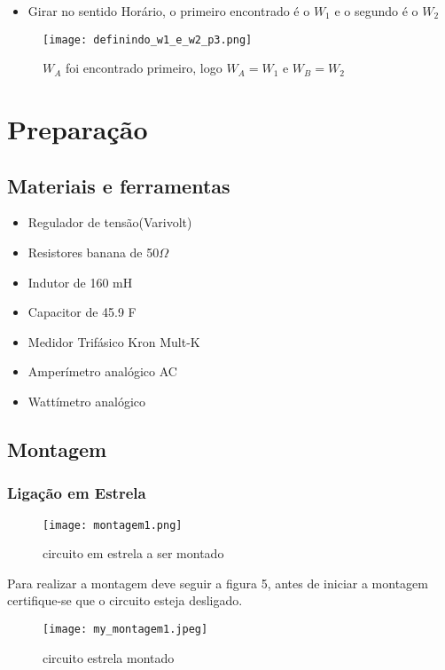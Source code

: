 \documentclass[a4paper, 12pt]{article}
\begin{document}
	\newpage
	\begin{itemize}
		\item Girar no sentido Horário, o primeiro encontrado é o $W_1$ e o segundo é o $W_2$
	\end{itemize}
	\begin{figure}[H]
		\centering %
		\texttt{[image: definindo\_w1\_e\_w2\_p3.png]}
		\caption{$W_A$ foi encontrado primeiro, logo $W_A = W_1$ e $W_B = W_2$}
	\end{figure}
	\newpage
	\section{Preparação}
	\subsection{Materiais e ferramentas}
	\begin{itemize}
		\item Regulador de tensão(Varivolt)
		\item Resistores banana de 50\(\Omega\)
		\item Indutor de 160 mH
		\item Capacitor de 45.9 \si{\micro}F
		\item Medidor Trifásico Kron Mult-K
		\item Amperímetro analógico AC
		\item Wattímetro analógico
	\end{itemize}
	\subsection{Montagem}
	\subsubsection{Ligação em Estrela}
	\begin{figure}[H]
		\centering %
		\texttt{[image: montagem1.png]}
		\caption{circuito em estrela a ser montado}
	\end{figure}
	Para realizar a montagem deve seguir a figura 5, antes de iniciar a montagem certifique-se que o circuito esteja desligado.
	\begin{figure}[H]
		\centering %
		\texttt{[image: my\_montagem1.jpeg]}
		\caption{circuito estrela montado}
	\end{figure}
	
\end{document}
